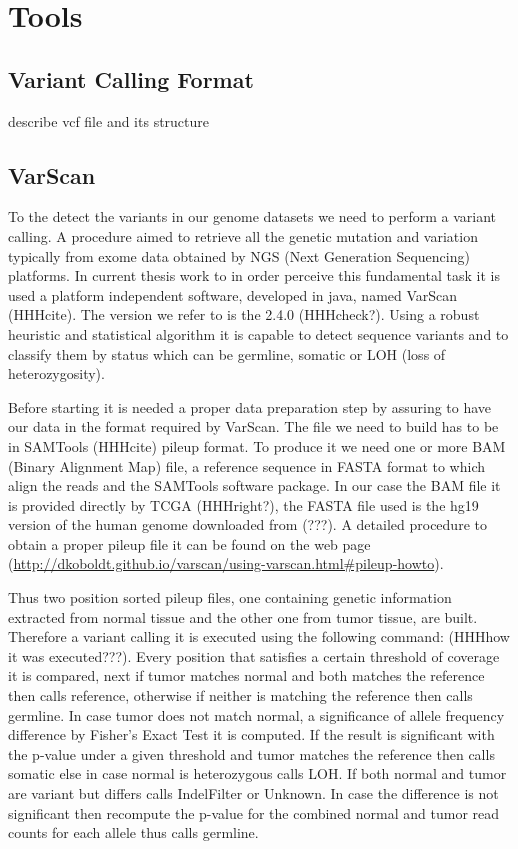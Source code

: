 \section{Tools}
\subsection{Variant Calling Format}
describe vcf file and its structure

\subsection{VarScan}
To the detect the variants in our genome datasets we need to perform a variant calling. A procedure aimed to retrieve all the genetic mutation and variation typically from exome data obtained by NGS (Next Generation Sequencing) platforms. In current thesis work to in order perceive this fundamental task it is used a platform independent software, developed in java, named VarScan (HHHcite). The version we refer to is the 2.4.0 (HHHcheck?). Using a robust heuristic and statistical algorithm it is capable to detect sequence variants and to classify them by status which can be germline, somatic or LOH (loss of heterozygosity).


Before starting it is needed a proper data preparation step by assuring to have our data in the format required by VarScan. The file we need to build has to be in SAMTools (HHHcite) pileup format. To produce it we need one or more BAM (Binary Alignment Map) file, a reference sequence in FASTA format to which align the reads and the SAMTools software package. In our case the BAM file it is provided directly by TCGA (HHHright?), the FASTA file used is the hg19 version of the human genome downloaded from (???). A detailed procedure to obtain a proper pileup file it can be found on the web page (\url{http://dkoboldt.github.io/varscan/using-varscan.html#pileup-howto}).


Thus two position sorted pileup files, one containing genetic information extracted from normal tissue and the other one from tumor tissue, are built. Therefore a variant calling it is executed using the following command: (HHHhow it was executed???). Every position that satisfies a certain threshold of coverage it is compared, next if tumor matches normal and both matches the reference then calls reference, otherwise if neither  is matching the reference then calls germline. In case tumor does not match normal, a significance of allele frequency difference by Fisher's Exact Test it is computed. If the result is significant with the p-value under a given threshold and tumor matches the reference then calls somatic else in case normal is heterozygous calls LOH. If both  normal and tumor are variant but differs calls IndelFilter or Unknown. In case the difference is not significant then recompute the p-value for the combined normal and tumor read counts for each allele thus calls germline.

